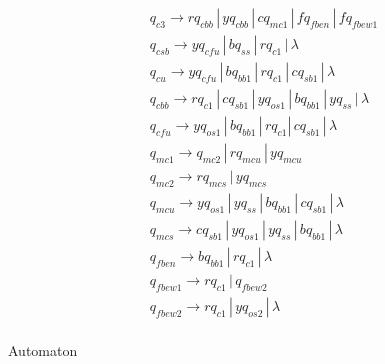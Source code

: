 \documentclass{article}
\begin{document}
\begin{mylist}
\begin{align*}
&q_{c3} \rightarrow rq_{cbb} \, | \,  yq_{cbb} \, | \, cq_{mc1} \, | \, fq_{fben} \, | \, fq_{fbew1}\ \\ 
&q_{csb} \rightarrow yq_{cfu} \, | \,  bq_{ss} \, | \, rq_{c1} \, | \, \lambda \\ 
&q_{cu} \rightarrow yq_{cfu} \, | \,  bq_{bb1} \, | \, rq_{c1} \, | \, cq_{sb1} \, | \, \lambda \\ 
&q_{cbb} \rightarrow rq_{c1} \, | \,  cq_{sb1} \, | \, yq_{os1} \, | \, bq_{bb1} \, | \, yq_{ss} \, | \, \lambda \\ 
&q_{cfu} \rightarrow yq_{os1} \, | \,  bq_{bb1} \, | \, rq_{c1} | \, cq_{sb1} \, | \, \lambda\\ 
&q_{mc1} \rightarrow q_{mc2} \, | \, rq_{mcu} \, | \, yq_{mcu}\\
&q_{mc2} \rightarrow rq_{mcs} \, | \, yq_{mcs}\\
&q_{mcu} \rightarrow yq_{os1} \, | \, yq_{ss} \, | \, bq_{bb1} \, | \, cq_{sb1} \, | \, \lambda\\
&q_{mcs} \rightarrow cq_{sb1} \, | \, yq_{os1} \, | \, yq_{ss} \, | \, bq_{bb1}\, | \, \lambda\\
&q_{fben} \rightarrow bq_{bb1} \, | \, rq_{c1} \, | \, \lambda\\
&q_{fbew1} \rightarrow rq_{c1} \, | \, q_{fbew2} \\
&q_{fbew2} \rightarrow rq_{c1} \, | \, yq_{os2} \, | \, \lambda\\
\end{align*}

\newpage
{}
\item Automaton

\begin{center}


\end{center}
\end{mylist}
\end{document}
